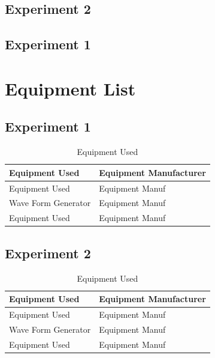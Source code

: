 \documentclass[a4paper]{article}
\begin{document}
\subsection{Experiment 2}
\lipsum[1]
\subsection{Experiment 1}
\lipsum[1]
\section{Equipment List}
\subsection{Experiment 1}
\begin{table}[H]
	\centering
	\caption{Equipment Used} %
	\label{EquipmentUsed}
	\begin{tabular}{|l||l|}
		\hline
		\textbf{Equipment Used}       & \textbf{Equipment Manufacturer}               \\
		\hline
		Equipment Used & Equipment Manuf                         \\
		\hline
		Wave Form Generator  & Equipment Manuf                       \\
		\hline
		Equipment Used         & Equipment Manuf \\
		\hline
	\end{tabular}
\end{table}
\subsection{Experiment 2}
\begin{table}[H]
	\centering
	\caption{Equipment Used} %
	\label{EquipmentUsed1}
	\begin{tabular}{|l||l|}
		\hline
		\textbf{Equipment Used}       & \textbf{Equipment Manufacturer}               \\
		\hline
		Equipment Used & Equipment Manuf                         \\
		\hline
		Wave Form Generator  & Equipment Manuf                       \\
		\hline
		Equipment Used         & Equipment Manuf \\
		\hline
	\end{tabular}
\end{table}
\end{document}
